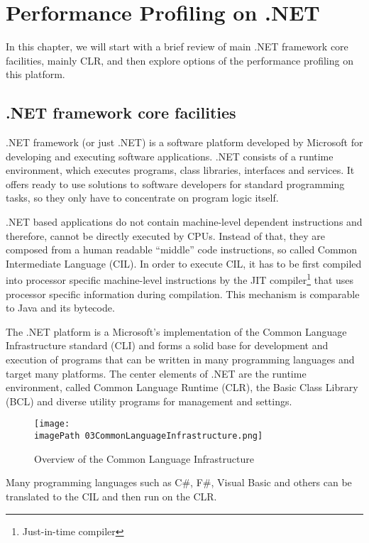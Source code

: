
\chapter{Performance Profiling on .NET}
\label{chapPerProfOnDotNet}

In this chapter, we will start with a brief review of main .NET framework core facilities, mainly CLR, and then explore options of the performance profiling on this platform. 

\section{.NET framework core facilities}
.NET framework (or just .NET) is a software platform developed by Microsoft for developing and executing software applications. .NET  consists of a runtime environment, which executes programs, class libraries, interfaces and services. It offers ready to use solutions to software developers for standard programming tasks, so they only have to concentrate on program logic itself.

.NET based applications do not contain machine-level dependent instructions and therefore, cannot be directly executed by CPUs. Instead of that, they are composed from a human readable ``middle'' code instructions, so called Common Intermediate Language (CIL). In order to execute CIL, it has to be first compiled into processor specific machine-level instructions by the JIT compiler\footnote{Just-in-time compiler} that uses processor specific information during compilation. This mechanism is comparable to Java and its bytecode.

The .NET platform is a Microsoft's implementation of the Common Language Infrastructure standard (CLI) and forms a solid base for development and execution of programs that can be written in many programming languages and target many platforms. The center elements of .NET are the runtime environment, called Common Language Runtime (CLR), the Basic Class Library (BCL) and diverse utility programs for management and settings.

\begin{figure}
	\centering
		\texttt{[image: \\imagePath 03CommonLanguageInfrastructure.png]}
		\caption{Overview of the Common Language Infrastructure \cite{OCLI} }
	\label{fig:03CommonLanguageInfrastructure}
\end{figure}

Many programming languages such as C\#, F\#, Visual Basic and others can be translated to the CIL and then run on the CLR. 

